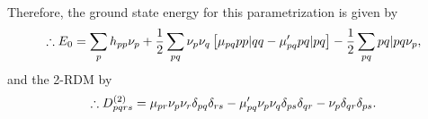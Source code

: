 Therefore, the ground state energy for this parametrization is given by
\begin{equation}
    \therefore
    E_0 =
    \sum_{p} h_{pp} \nu_p +
    \frac{1}{2} \sum_{pq} 
    \nu_p \nu_q
    \left[ 
        \mu_{pq} \PBraket{pp | qq}
        -
        \mu_{pq}^{\prime} \PBraket{pq | pq}
    \right]
    -
    \frac{1}{2} \sum_{pq} 
    \PBraket{pq | pq} \nu_p
    ,
\end{equation}
and the 2-RDM by 
\begin{equation}
    \therefore
    D^{\left( 2 \right)}_{pqrs} =
    \mu_{pr} \nu_p \nu_r \delta_{pq} \delta_{rs}
    -
    \mu_{pq}^{\prime} \nu_p \nu_q \delta_{ps} \delta_{qr}
    -
    \nu_p \delta_{qr} \delta_{ps}
    .
\end{equation}

